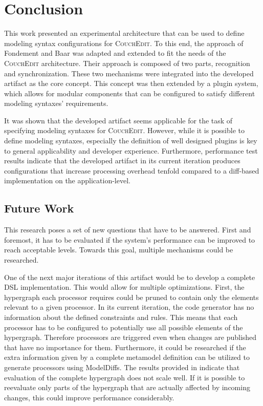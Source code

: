 \chapter{Conclusion}
\label{ch:conclusion}

This work presented an experimental architecture that can be used to define modeling syntax configurations for \textsc{CouchEdit}. To this end, the approach of Fondement and Baar \cite{fondement_making_2005} was adapted and extended to fit the needs of the \textsc{CouchEdit} architecture. Their approach is composed of two parts, recognition and synchronization. These two mechanisms were integrated into the developed artifact as the core concept. This concept was then extended by a plugin system, which allows for modular components that can be configured to satisfy different modeling syntaxes' requirements.

It was shown that the developed artifact seems applicable for the task of specifying modeling syntaxes for \textsc{CouchEdit}. However, while it is possible to define modeling syntaxes, especially the definition of well designed plugins is key to general applicability and developer experience. Furthermore, performance test results indicate that the developed artifact in its current iteration produces configurations that increase processing overhead tenfold compared to a diff-based implementation on the application-level.  

\section{Future Work}
This research poses a set of new questions that have to be answered. First and foremost, it has to be evaluated if the system's performance can be improved to reach acceptable levels. Towards this goal, multiple mechanisms could be researched.

One of the next major iterations of this artifact would be to develop a complete DSL implementation. This would allow for multiple optimizations. First, the hypergraph each processor requires could be pruned to contain only the elements relevant to a given processor. In its current iteration, the code generator has no information about the defined constraints and rules. This means that each processor has to be configured to potentially use all possible elements of the hypergraph. Therefore processors are triggered even when changes are published that have no importance for them. Furthermore, it could be researched if the extra information given by a complete metamodel definition can be utilized to generate processors using ModelDiffs. The results provided in  indicate that evaluation of the complete hypergraph does not scale well. If it is possible to reevaluate only parts of the hypergraph that are actually affected by incoming changes, this could improve performance considerably.

